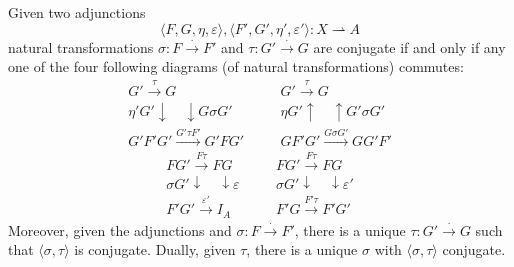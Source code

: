 Given two adjunctions
$$\langle F, G, \eta, \varepsilon \rangle, \langle F', G', \eta', \varepsilon' \rangle : X \rightharpoonup A$$
natural transformations $\sigma : F \xrightarrow{\cdot} F'$ and $\tau : G' \xrightarrow{\cdot} G$ are conjugate if and only if any one of the four following diagrams (of natural transformations) commutes:
$$\begin{array}{ccc}
G' \xrightarrow{\tau} G &\quad& G' \xrightarrow{\tau} G \\
\eta' G' \downarrow \quad \downarrow G\sigma G' &\quad& \eta G' \uparrow \quad \uparrow G'\sigma G' \\
G'F'G' \xrightarrow{G'\tau F'} G'FG' &\quad& GF'G' \xrightarrow{G\sigma G'} GG'F'
\end{array}$$
$$\begin{array}{ccc}
FG' \xrightarrow{F\tau} FG &\quad& FG' \xrightarrow{F\tau} FG \\
\sigma G' \downarrow \quad \downarrow \varepsilon &\quad& \sigma G' \downarrow \quad \downarrow \varepsilon' \\
F'G' \xrightarrow{\varepsilon'} I_A &\quad& F'G \xrightarrow{F'\tau} F'G'
\end{array}$$
Moreover, given the adjunctions and $\sigma : F \xrightarrow{\cdot} F'$, there is a unique $\tau : G' \xrightarrow{\cdot} G$ such that $\langle \sigma, \tau \rangle$ is conjugate. Dually, given $\tau$, there is a unique $\sigma$ with $\langle \sigma, \tau \rangle$ conjugate.
